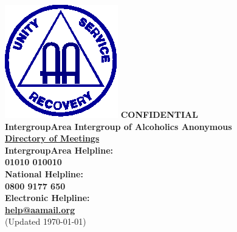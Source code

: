 \documentclass[a4paper]{article}
\begin{document}
\newpage{}
\vspace*{2.0cm}
\centering
\includegraphics[scale=1.5]{aa_logo.eps}
{\LARGE \bf CONFIDENTIAL\\
\vspace{0.5cm}
IntergroupArea Intergroup of Alcoholics Anonymous\\
\vspace{0.5cm}
\underline{Directory of Meetings}\\
\vspace{0.5cm}
IntergroupArea Helpline:\\
\vspace{0.2cm}
01010 010010\\
\vspace{0.5cm}
National Helpline:\\
\vspace{0.2cm}
0800 9177 650\\
\vspace{0.5cm}
Electronic Helpline:\\
\vspace{0.2cm}
\href{mailto:help@aamail.org}{help@aamail.org}}\\
\vspace{0.5cm}
{\large (Updated \today{})}

\endcenter
\end{document}
